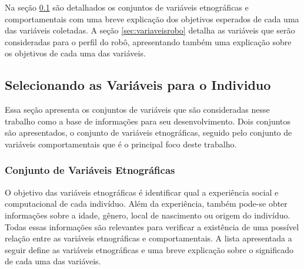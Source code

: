 Na seção \ref{sec:variaveisindividuo} são detalhados os conjuntos de variáveis etnográficas e comportamentais com uma breve explicação dos objetivos esperados de cada uma das variáveis coletadas. A seção \ref{sec:variaveisrobo} detalha as variáveis que serão consideradas para o perfil do robô, apresentando também uma explicação sobre os objetivos de cada uma das variáveis.

\subsection{Selecionando as Variáveis para o Individuo}
\label{sec:variaveisindividuo}

Essa seção apresenta os conjuntos de variáveis que são consideradas nesse trabalho como a base de informações para seu desenvolvimento. Dois conjuntos são apresentados, o conjunto de variáveis etnográficas, seguido pelo conjunto de variáveis comportamentais que é o principal foco deste trabalho.

\subsubsection{Conjunto de Variáveis Etnográficas}
\label{sec:variaveisetnograficas}

O objetivo das variáveis etnográficas é identificar qual a experiência social e computacional de cada indivíduo. Além da experiência, também pode-se obter informações sobre a idade, gênero, local de nascimento ou origem do indivíduo. Todas essas informações são relevantes para verificar a existência de uma possível relação entre as variáveis etnográficas e comportamentais. A lista apresentada a seguir define as variáveis etnográficas e uma breve explicação sobre o significado de cada uma das variáveis.

